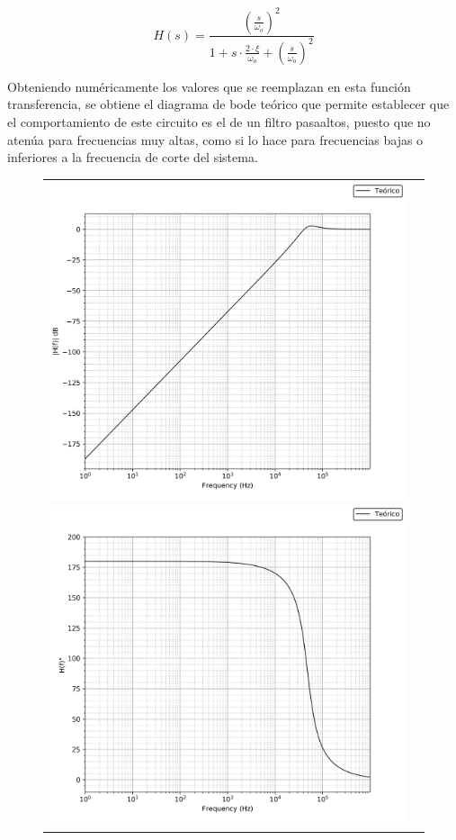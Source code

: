 \begin{equation}
    H(s) = \frac{\left(\frac{s}{\omega_o} \right)^{2}}{1 + s \cdot \frac{2 \cdot \xi}{\omega_o} + \left( \frac{s}{\omega_o} \right)^{2}}
    \label{eq:trans_PA}
\end{equation}

Obteniendo num\'ericamente los valores que se reemplazan en esta funci\'on transferencia, se obtiene el diagrama de bode te\'orico que permite establecer
que el comportamiento de este circuito es el de un filtro pasaaltos, puesto que no aten\'ua para frecuencias muy altas, como si lo hace para frecuencias bajas o 
inferiores a la frecuencia de corte del sistema.

\begin{figure}[H]
    \centering
    \begin{tabular}{c c}
        \includegraphics[scale=0.3]{Recursos/bode_teorico_pasaaltos_modulo.png}
        \includegraphics[scale=0.3]{Recursos/bode_teorico_pasaaltos_fase.png}

\end{tabular}
\end{figure}
